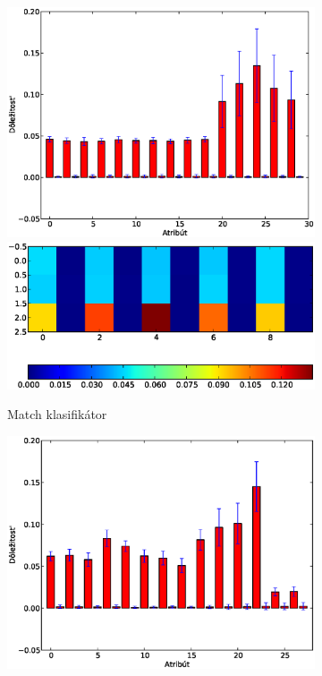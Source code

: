\begin{figure}[htbp]
        \centering
        \begin{subfigure}[t]{0.4\textwidth}
                \includegraphics[width=\textwidth]{images/clf_fi/randomforest_combined_5_bars}
                \includegraphics[width=\textwidth]{images/clf_fi/randomforest_combined_5_heatmap}
                \caption{Match klasifikátor}
                \label{fig:datatype4-m}
        \end{subfigure}%
        \qquad\qquad %
        \begin{subfigure}[t]{0.4\textwidth}
                \includegraphics[width=\textwidth]{images/clf_fi/randomforest_combined_5_indel_bars}

\end{subfigure}
\end{figure}
